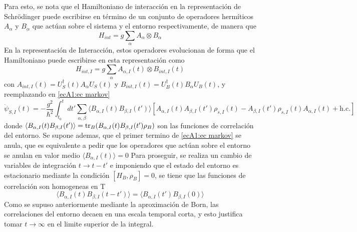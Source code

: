Para esto, se nota que el Hamiltoniano de interacción en la representación de Schrödinger puede escribirse en término de un conjunto de operadores hermíticos ${A_\alpha}$ y ${B_\alpha}$ que actúan sobre el sistema y el entorno respectivamente, de manera que 
\begin{equation}
    H_{int}=g\sum_\alpha A_\alpha\otimes B_\alpha
\end{equation}
En la representación de Interacción, estos operadores evolucionan de forma que el Hamiltoniano puede escribirse en esta representación como
\begin{equation}
    H_{int,I}=g\sum_\alpha A_{\alpha,I}(t)\otimes B_{int,I}(t)
\end{equation}
con $A_{int,I}(t)=U^\dagger_S(t)A_\alpha U_S(t)$ y $B_{int,I}(t)=U^\dagger_B(t)B_\alpha U_B(t)$, y reemplazando en \ref{ecA1:ec markov}
\begin{equation}
    \dot \psi_{S,I}(t)=-\frac{g^2}{\hbar^2}\int_{t_0}^{t}dt'\sum_{\alpha,\beta}\langle B_{\alpha,I}(t)B_{\beta,I}(t') \rangle [A_{\alpha,I}(t)A_{\beta,I}(t')\rho_{s,I}(t)-A_{\beta,I}(t')\rho_{s,I}(t)A_{\alpha,I}(t) + \text{h.c.}]
\end{equation}
donde $\langle B_{\alpha,I}(t)B_{\beta,I}(t') \rangle = \tr_B( B_{\alpha,I}(t)B_{\beta,I}(t') \rho_B)$ son las funciones de correlación del entorno. Se supone ademas, que el primer termino de \ref{ecA1:ec markov} se anula, que es equivalente a pedir que los operadores que actúan sobre el entorno se anulan en valor medio $\langle B_{\alpha,I}(t) \rangle =0$
Para proseguir, se realiza un cambio de variables de integración $t \rightarrow t-t'$ e imponiendo que el estado del entorno es estacionario mediante la condición $[H_B,\rho_B]=0$, se tiene que las funciones de correlación son homogeneas en T
\begin{equation}
    \langle B_{\alpha,I}(t)B_{\beta,I}(t-t') \rangle = \langle B_{\alpha,I}(t')B_{\beta,I}(0) \rangle
\end{equation}
Como se supuso anteriormente mediante la aproximación de Born, las correlaciones del entorno decaen en una escala temporal corta, y esto justifica tomar $t\rightarrow \infty$ en el limite superior de la integral.

